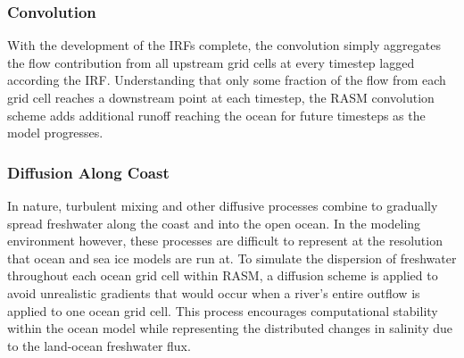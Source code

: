 \subsubsection{Convolution}

With the development of the IRFs complete, the convolution simply aggregates the flow contribution from all upstream grid cells at every timestep lagged according the IRF.  Understanding that only some fraction of the flow from each grid cell reaches a downstream point at each timestep, the RASM convolution scheme adds additional runoff reaching the ocean for future timesteps as the model progresses.

\subsubsection{Diffusion Along Coast}

In nature, turbulent mixing and other diffusive processes combine to gradually spread freshwater along the coast and into the open ocean.  In the modeling environment however, these processes are difficult to represent at the resolution that ocean and sea ice models are run at.  To simulate the dispersion of freshwater throughout each ocean grid cell within RASM, a diffusion scheme is applied to avoid unrealistic gradients that would occur when a river’s entire outflow is applied to one ocean grid cell.  This process encourages computational stability within the ocean model while representing the distributed changes in salinity due to the land-ocean freshwater flux.  
  
  
  
